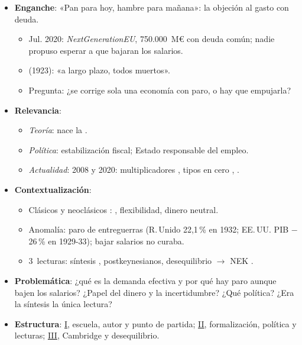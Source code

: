 \documentclass{article}
\begin{document}
\cabecerarepaso
\begin{columnas}

\begin{itemize}
\item \textbf{Enganche}: «Pan para hoy, hambre para mañana»: la objeción al gasto con deuda.
  \begin{itemize}
  \item Jul. 2020: \emph{NextGenerationEU}, 750.000~M€ con deuda común; nadie propuso esperar a que bajaran los salarios.
  \item {} (1923): «a largo plazo, todos muertos».
  \item Pregunta: ¿se corrige sola una economía con paro, o hay que empujarla?
  \end{itemize}
\item \textbf{Relevancia}:
  \begin{itemize}
  \item \emph{Teoría}: nace la  .
  \item \emph{Política}: estabilización fiscal; Estado responsable del empleo.
  \item \emph{Actualidad}: 2008 y 2020: multiplicadores , tipos en cero ,  .
  \end{itemize}
\item \textbf{Contextualización}:
  \begin{itemize}
  \item Clásicos y neoclásicos  : , flexibilidad, dinero neutral.
  \item Anomalía: paro de entreguerras (R.\,Unido 22,1\,\% en 1932; EE.\,UU. PIB $-$26\,\% en 1929-33); bajar salarios no curaba.
  \item 3~lecturas: síntesis , postkeynesianos, desequilibrio $\to$ NEK .
  \end{itemize}
\item \textbf{Problemática}: ¿qué es la demanda efectiva y por qué hay paro aunque bajen los salarios? ¿Papel del dinero y la incertidumbre? ¿Qué política? ¿Era la síntesis la única lectura?
\item \textbf{Estructura}: \hyperref[rep:I]{I}, escuela, autor y punto de partida; \hyperref[rep:II]{II}, formalización, política y lecturas; \hyperref[rep:III]{III}, Cambridge y desequilibrio.

\end{itemize}
\end{columnas}
\end{document}
